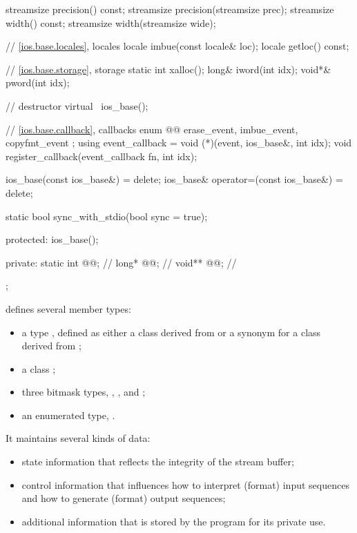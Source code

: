 \begin{codeblock}
{{    streamsize precision() const;
    streamsize precision(streamsize prec);
    streamsize width() const;
    streamsize width(streamsize wide);

    // \ref{ios.base.locales}, locales
    locale imbue(const locale& loc);
    locale getloc() const;

    // \ref{ios.base.storage}, storage
    static int xalloc();
    long&  iword(int idx);
    void*& pword(int idx);

    // destructor
    virtual ~ios_base();

    // \ref{ios.base.callback}, callbacks
    enum @@ { erase_event, imbue_event, copyfmt_event };
    using event_callback = void (*)(event, ios_base&, int idx);
    void register_callback(event_callback fn, int idx);

    ios_base(const ios_base&) = delete;
    ios_base& operator=(const ios_base&) = delete;

    static bool sync_with_stdio(bool sync = true);

  protected:
    ios_base();

  private:
    static int @@;           // \expos
    long*  @@;              // \expos
    void** @@;              // \expos
  };
}
\end{codeblock}

\pnum
{}
defines several member types:
\begin{itemize}
\item a type , defined as either a class derived from
 or a synonym for a class derived from ;

\item a class ;

\item three bitmask types, , , and ;

\item an enumerated type, .
\end{itemize}

\pnum
It maintains several kinds of data:
\begin{itemize}
\item
state information that reflects the integrity of the stream buffer;
\item
control information that influences how to interpret (format) input
sequences and how to generate (format) output sequences;
\item
additional information that is stored by the program for its private use.
\end{itemize}

